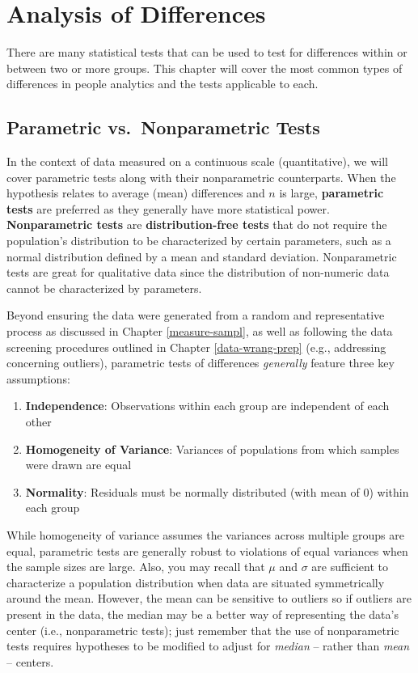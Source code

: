 \documentclass[]{book}
\providecommand{\tightlist}{%
  \setlength{\itemsep}{0pt}\setlength{\parskip}{0pt}}
\begin{document}
\hypertarget{aod}{%
\chapter{Analysis of Differences}\label{aod}}

There are many statistical tests that can be used to test for differences within or between two or more groups. This chapter will cover the most common types of differences in people analytics and the tests applicable to each.

\hypertarget{parametric-vs.nonparametric-tests}{%
\section{Parametric vs.~Nonparametric Tests}\label{parametric-vs.nonparametric-tests}}

In the context of data measured on a continuous scale (quantitative), we will cover parametric tests along with their nonparametric counterparts. When the hypothesis relates to average (mean) differences and \(n\) is large, \textbf{parametric tests} are preferred as they generally have more statistical power. \textbf{Nonparametric tests} are \textbf{distribution-free tests} that do not require the population's distribution to be characterized by certain parameters, such as a normal distribution defined by a mean and standard deviation. Nonparametric tests are great for qualitative data since the distribution of non-numeric data cannot be characterized by parameters.

Beyond ensuring the data were generated from a random and representative process as discussed in Chapter \ref{measure-sampl}, as well as following the data screening procedures outlined in Chapter \ref{data-wrang-prep} (e.g., addressing concerning outliers), parametric tests of differences \emph{generally} feature three key assumptions:

\begin{enumerate}
\def\labelenumi{\arabic{enumi}.}
\tightlist
\item
  \textbf{Independence}: Observations within each group are independent of each other
\item
  \textbf{Homogeneity of Variance}: Variances of populations from which samples were drawn are equal
\item
  \textbf{Normality}: Residuals must be normally distributed (with mean of 0) within each group
\end{enumerate}

While homogeneity of variance assumes the variances across multiple groups are equal, parametric tests are generally robust to violations of equal variances when the sample sizes are large. Also, you may recall that \(\mu\) and \(\sigma\) are sufficient to characterize a population distribution when data are situated symmetrically around the mean. However, the mean can be sensitive to outliers so if outliers are present in the data, the median may be a better way of representing the data's center (i.e., nonparametric tests); just remember that the use of nonparametric tests requires hypotheses to be modified to adjust for \emph{median} -- rather than \emph{mean} -- centers.
\end{document}

